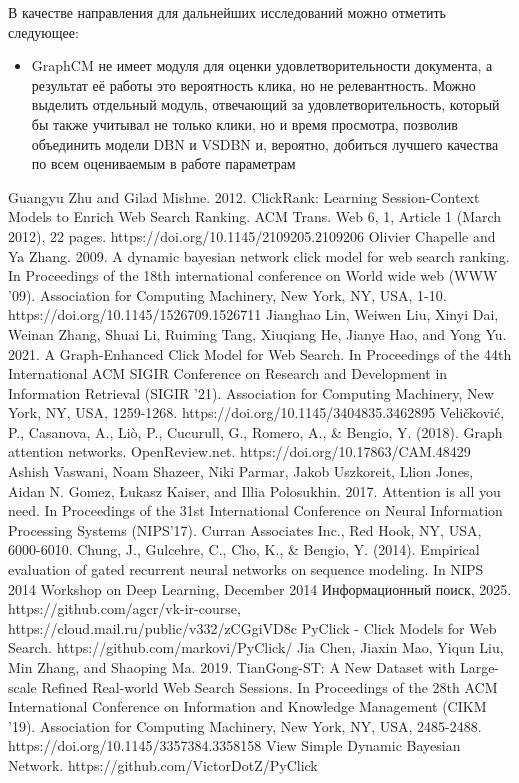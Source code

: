 \documentclass[diploma]{nanolab2015}
\begin{document}
В качестве направления для дальнейших исследований можно отметить следующее:
\begin{itemize}
    \item GraphCM не имеет модуля для оценки удовлетворительности документа, а результат её работы это вероятность клика, но не релевантность. Можно выделить отдельный модуль, отвечающий за удовлетворительность, который бы также учитывал не только клики, но и время просмотра, позволив объединить модели DBN и VSDBN и, вероятно, добиться лучшего качества по всем оцениваемым в работе параметрам
\end{itemize}


\begin{thebibliography}{00}
    Guangyu Zhu and Gilad Mishne. 2012. ClickRank: Learning Session-Context Models to Enrich Web Search Ranking. ACM Trans. Web 6, 1, Article 1 (March 2012), 22 pages. https://doi.org/10.1145/2109205.2109206
    Olivier Chapelle and Ya Zhang. 2009. A dynamic bayesian network click model for web search ranking. In Proceedings of the 18th international conference on World wide web (WWW '09). Association for Computing Machinery, New York, NY, USA, 1-10. https://doi.org/10.1145/1526709.1526711
    Jianghao Lin, Weiwen Liu, Xinyi Dai, Weinan Zhang, Shuai Li, Ruiming Tang, Xiuqiang He, Jianye Hao, and Yong Yu. 2021. A Graph-Enhanced Click Model for Web Search. In Proceedings of the 44th International ACM SIGIR Conference on Research and Development in Information Retrieval (SIGIR '21). Association for Computing Machinery, New York, NY, USA, 1259-1268. https://doi.org/10.1145/3404835.3462895
    Veličković, P., Casanova, A., Liò, P., Cucurull, G., Romero, A., \& Bengio, Y. (2018). Graph attention networks. OpenReview.net. https://doi.org/10.17863/CAM.48429
    Ashish Vaswani, Noam Shazeer, Niki Parmar, Jakob Uszkoreit, Llion Jones, Aidan N. Gomez, Łukasz Kaiser, and Illia Polosukhin. 2017. Attention is all you need. In Proceedings of the 31st International Conference on Neural Information Processing Systems (NIPS'17). Curran Associates Inc., Red Hook, NY, USA, 6000-6010.
    Chung, J., Gulcehre, C., Cho, K., \& Bengio, Y. (2014). Empirical evaluation of gated recurrent neural networks on sequence modeling. In NIPS 2014 Workshop on Deep Learning, December 2014
    Информационный поиск, 2025. https://github.com/agcr/vk-ir-course, https://cloud.mail.ru/public/v332/zCGgiVD8c
    PyClick - Click Models for Web Search. https://github.com/markovi/PyClick/
    Jia Chen, Jiaxin Mao, Yiqun Liu, Min Zhang, and Shaoping Ma. 2019. TianGong-ST: A New Dataset with Large-scale Refined Real-world Web Search Sessions. In Proceedings of the 28th ACM International Conference on Information and Knowledge Management (CIKM '19). Association for Computing Machinery, New York, NY, USA, 2485-2488. https://doi.org/10.1145/3357384.3358158
    View Simple Dynamic Bayesian Network. https://github.com/VictorDotZ/PyClick
\end{thebibliography}
\end{document}
